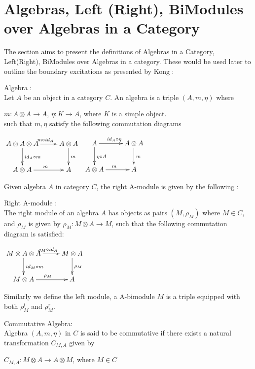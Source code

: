\section{Algebras, Left (Right), BiModules over Algebras in a Category}
    
    The section aims to present the definitions of Algebras in a Category, Left(Right), BiModules over Algebras in
a category. These would be used later to outline the boundary excitations as presented by Kong \cite{Reference5} :

\begin{defn}
Algebra : \\
    Let $A$ be an object in a category $C$. An algebra is a triple $(A, m, \eta)$ where 

    $m : A \otimes A \rightarrow A$,  
    $\eta : K \rightarrow A$, where $K$ is a simple object.\\
such that $m, \eta$ satisfy the following commutation diagrams \\
\begin{center}
$\xymatrix{
A \otimes A \otimes A \ar[r]^{m \circ id_{A}} \ar[d]^{id_{A} \circ m} & A \otimes A \ar[d]^{m} \\
A \otimes A \ar[r]^{m}  & A 
}$
$\xymatrix{
A \ar[r]^{id_{A} \circ \eta} \ar[d]^{\eta \circ A} & A \otimes A \ar[d]^{m} \\
A \otimes A \ar[r]^{m}  & A 
}$
\end{center}
\end{defn}

Given algebra $A$ in category $C$, the right A-module is given by the following : \\
\begin{defn}
Right A-module :\\
    The right module of an algebra $A$ has objects as pairs $(M, \rho_{M})$ where $M \in C$, and $\rho_{M}$ is given by
$\rho_{M} : M \otimes A \rightarrow M$, such that the following commutation diagram is satisfied:\\
\begin{center}
$\xymatrix{
M \otimes A \otimes A \ar[r]^{\rho_{M} \circ id_{A}} \ar[d]^{id_{M} \circ m} & M \otimes A \ar[d]^{\rho_{M}} \\
M \otimes A \ar[r]^{\rho_{M}}  & A 
}$
\end{center}
\end{defn}

Similarly we define the left module, a A-bimodule $M$ is a triple equipped with both $\rho^{l}_{M}$ and $\rho^{r}_{M}$. \\
\begin{defn}
 Commutative Algebra:\\
         Algebra $(A, m, \eta)$ in $C$ is said to be commutative if there exists a natural transformation $C_{M,A}$ given by
         \begin{center}
             $C_{M,A} :  M \otimes A \rightarrow A \otimes M$, where $M \in C$
         \end{center}
\end{defn}

